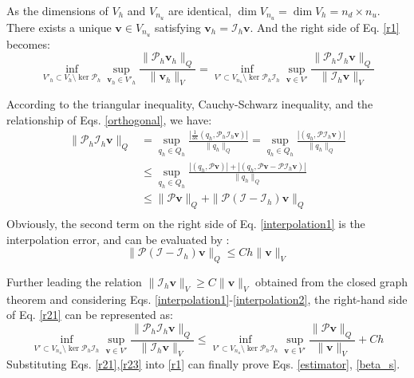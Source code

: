 \begin{pf}
As the dimensions of $V_h$ and $V_{n_u}$ are identical, $\dim V_{n_u} = \dim V_h = n_d \times n_u$. There exists a unique $\boldsymbol{v} \in V_{n_u}$ satisfying $\boldsymbol{v}_h = \mathcal{I}_h \boldsymbol{v}$. And the right side of Eq. \eqref{r1} becomes:
\begin{equation}\label{r21}
\inf_{V'_h \subset V_h \setminus \ker \mathcal{P}_h} \sup_{\boldsymbol{v}_h \in V'_h} \frac{\|\mathcal{P}_h \boldsymbol{v}_h\|_Q}{\|\boldsymbol{v}_h\|_V} = \inf_{V' \subset V_{n_u} \setminus \ker \mathcal{P}_h \mathcal{I}_h} \sup_{\boldsymbol{v} \in V'} \frac{\|\mathcal{P}_h \mathcal{I}_h \boldsymbol{v}\|_Q}{\|\mathcal{I}_h \boldsymbol{v}\|_V}
\end{equation}

According to the triangular inequality, Cauchy-Schwarz inequality, and the relationship of Eqs. \eqref{orthogonal}, we have:
\begin{equation}\label{interpolation1}
\begin{aligned}
\|\mathcal{P}_h \mathcal{I}_h \boldsymbol{v}\|_Q &= \sup_{q_h \in Q_h} \frac{|\frac{1}{3\kappa} (q_h, \mathcal{P}_h \mathcal{I}_h \boldsymbol{v})|}{\|q_h\|_Q} = \sup_{q_h \in Q_h} \frac{|(q_h, \mathcal{P} \mathcal{I}_h \boldsymbol{v})|}{\|q_h\|_Q} \\
&\le \sup_{q_h \in Q_h} \frac{|(q_h, \mathcal{P} \boldsymbol{v})| + |(q_h, \mathcal{P} \boldsymbol{v} - \mathcal{P} \mathcal{I}_h \boldsymbol{v})|}{\|q_h\|_Q} \\
&\le \|\mathcal{P} \boldsymbol{v}\|_Q + \|\mathcal{P} (\mathcal{I} - \mathcal{I}_h) \boldsymbol{v}\|_Q \\
\end{aligned}
\end{equation}
Obviously, the second term on the right side of Eq. \eqref{interpolation1} is the interpolation error, and can be evaluated by \cite{yosida1995}:
\begin{equation}
\label{interpolation2}
\|\mathcal{P} (\mathcal{I} - \mathcal{I}_h) \boldsymbol{v}\|_Q \le Ch \|\boldsymbol{v}\|_V
\end{equation}

Further leading the relation $\|\mathcal{I}_h \boldsymbol{v}\|_V \ge C \|\boldsymbol{v}\|_V$ obtained from the closed graph theorem \cite{quarteroni1994} and considering Eqs. \eqref{interpolation1}-\eqref{interpolation2}, the right-hand side of Eq. \eqref{r21} can be represented as:
\begin{equation}\label{r23}
\inf_{V' \subset V_{n_u} \setminus \ker \mathcal{P}_h \mathcal{I}_h} \sup_{\boldsymbol{v} \in V'} \frac{\|\mathcal{P}_h \mathcal{I}_h \boldsymbol{v}\|_Q}{\|\mathcal{I}_h \boldsymbol{v}\|_V} \le \inf_{V' \subset V_{n_u} \setminus \ker \mathcal{P}_h \mathcal{I}_h} \sup_{\boldsymbol{v} \in V'} \frac{\|\mathcal{P} \boldsymbol{v}\|_Q}{\|\boldsymbol{v}\|_V} + Ch
\end{equation}
Substituting Eqs. \eqref{r21},\eqref{r23} into \eqref{r1} can finally prove Eqs. \eqref{estimator}, \eqref{beta_s}.
\end{pf}


